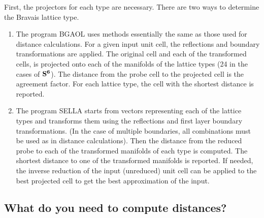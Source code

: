 \documentclass[preprint]{iucr}              %
\numberwithin{equation}{section}
\newcommand{\SVI}[0]{$\bf{S^{6}}$}
\begin{document}
			First, the projectors for each type are necessary.  There are two ways to determine the Bravais lattice type.
			\begin{enumerate}
				\item The program BGAOL uses methods essentially the same as those used for distance calculations. 
				For a given input unit cell, the reflections and boundary transformations are applied. The 
				original cell and each of the transformed cells, is projected onto each of
				the manifolds of the lattice types (24 in the cases of \SVI{}). The distance from
				the probe cell to the projected cell is the agreement factor. For each lattice type,
				the cell with the shortest distance is reported.
				\item The program SELLA \cite{andrews2022unnecessarily} starts from vectors representing each of the lattice
				types and transforms them using the reflections and first layer boundary transformations.
				(In the case of multiple boundaries, all combinations must be used as in distance calculations).
				Then the distance from the reduced probe to each of the transformed manifolds of each type
				is computed. The shortest distance to one of the transformed manifolds is reported. If
				needed, the inverse reduction of the input (unreduced) unit cell can be applied to the 
				best projected cell to get the best approximation of the input.
				
			\end{enumerate}
	
	\subsection{What do you need to compute distances?}
	
\end{document}

